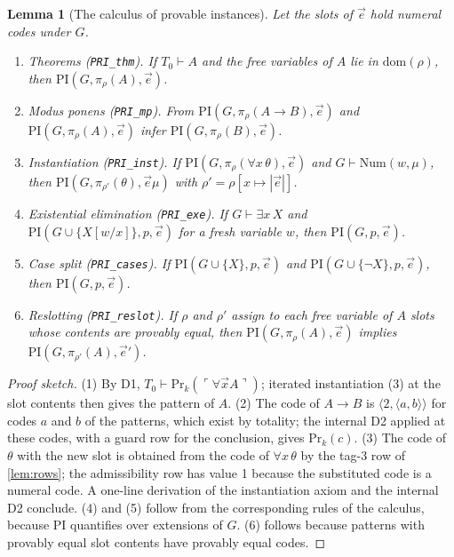 \documentclass[11pt]{article}
\theoremstyle{plain}
\newtheorem{lemma}[theorem]{Lemma}
\theoremstyle{definition}
\theoremstyle{remark}
\newcommand{\T}[1]{T_{#1}}
\newcommand{\Prv}{\mathrm{Pr}}
\newcommand{\gn}[1]{\ulcorner #1 \urcorner}
\newcommand{\Num}{\mathrm{Num}}
\newcommand{\PRI}{\mathrm{PI}}
\newcommand{\pair}[2]{\langle #1, #2\rangle}
\newcommand{\rocq}[1]{\texttt{#1}}
\begin{document}
\begin{lemma}[The calculus of provable instances]\label{lem:pi}
Let the slots of $\vec e$ hold numeral codes under $G$.
\begin{enumerate}
  \item \emph{Theorems} (\rocq{PRI\_thm}).  If $\T0 \vdash A$ and the free
    variables of $A$ lie in $\mathrm{dom}(\rho)$, then
    $\PRI(G, \pi_\rho(A), \vec e)$.
  \item \emph{Modus ponens} (\rocq{PRI\_mp}).  From
    $\PRI(G, \pi_\rho(A \to B), \vec e)$ and $\PRI(G, \pi_\rho(A), \vec e)$
    infer $\PRI(G, \pi_\rho(B), \vec e)$.
  \item \emph{Instantiation} (\rocq{PRI\_inst}).  If
    $\PRI(G, \pi_\rho(\forall x\,\theta), \vec e)$ and
    $G \vdash \Num(w, \mu)$, then
    $\PRI(G, \pi_{\rho'}(\theta), \vec e\mu)$ with
    $\rho' = \rho[x \mapsto |\vec e|]$.
  \item \emph{Existential elimination} (\rocq{PRI\_exe}).  If
    $G \vdash \exists x\, X$ and $\PRI(G \cup \{X[w/x]\}, p, \vec e)$ for a
    fresh variable $w$, then $\PRI(G, p, \vec e)$.
  \item \emph{Case split} (\rocq{PRI\_cases}).  If
    $\PRI(G \cup \{X\}, p, \vec e)$ and $\PRI(G \cup \{\neg X\}, p, \vec e)$,
    then $\PRI(G, p, \vec e)$.
  \item \emph{Reslotting} (\rocq{PRI\_reslot}).  If $\rho$ and $\rho'$
    assign to each free variable of $A$ slots whose contents are
    provably equal, then $\PRI(G,\pi_\rho(A),\vec e)$ implies
    $\PRI(G,\pi_{\rho'}(A),\vec e')$.
\end{enumerate}
\end{lemma}

\begin{proof}[Proof sketch]
(1) By D1, $\T0 \vdash \Prv_k(\gn{\forall \vec x A})$; iterated
instantiation (3) at the slot contents then gives the pattern of $A$.
(2) The code of $A \to B$ is $\pair{2}{\pair{a}{b}}$ for codes $a$ and
$b$ of the patterns, which exist by totality; the internal D2 applied at
these codes, with a guard row for the conclusion, gives $\Prv_k(c)$.
(3) The code of $\theta$ with the new slot is obtained from the code of
$\forall x\,\theta$ by the tag-3 row of \cref{lem:rows}; the admissibility
row has value 1 because the substituted code is a numeral code.  A
one-line derivation of the instantiation axiom and the internal D2
conclude.  (4) and (5) follow from the corresponding rules of the
calculus, because $\PRI$ quantifies over extensions of $G$.  (6) follows
because patterns with provably equal slot contents have provably equal
codes.
\end{proof}
\end{document}
